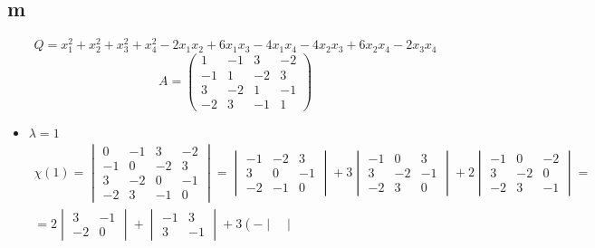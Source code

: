 \subsection{m}

$$ Q = x_1^2 + x_2^2 + x_3^2 + x_4^2 - 2x_1x_2 + 6x_1x_3 - 4x_1x_4 - 4x_2x_3 + 6x_2x_4 - 2x_3x_4 $$
$$ A =
\begin{pmatrix}
	1 & -1 & 3 & -2 \\
    -1 & 1 & -2 & 3 \\
    3 & -2 & 1 & -1 \\
    -2 & 3 & -1 & 1
\end{pmatrix} $$
\begin{itemize}
	\item $ \lambda = 1 $
    \begin{multline*}
        \chi(1) =
        \begin{vmatrix}
            0 & -1 & 3 & -2 \\
            -1 & 0 & -2 & 3 \\
            3 & -2 & 0 & -1 \\
            -2 & 3 & -1 & 0
        \end{vmatrix} =
        \begin{vmatrix}
        	-1 & -2 & 3 \\
            3 & 0 & -1 \\
            -2 & -1 & 0
        \end{vmatrix} + 3
        \begin{vmatrix}
        	-1 & 0 & 3 \\
            3 & -2 & -1 \\
            -2 & 3 & 0
        \end{vmatrix} + 2
        \begin{vmatrix}
        	-1 & 0 & -2 \\
            3 & -2 & 0 \\
            -2 & 3 & -1
        \end{vmatrix} = \\
        = 2
        \begin{vmatrix}
        	3 & -1 \\
            -2 & 0
        \end{vmatrix} +
        \begin{vmatrix}
        	-1 & 3 \\
            3 & -1
        \end{vmatrix} + 3\left( -
        \begin{vmatrix}

\end{vmatrix}
\end{multline*}
\end{itemize}

